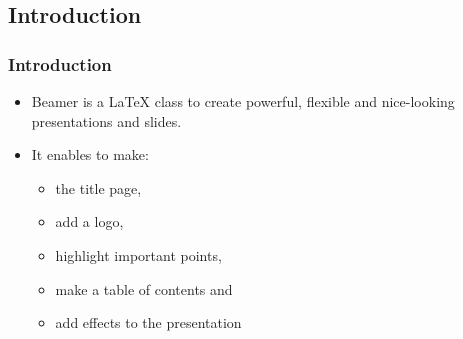 \documentclass[12pt]{beamer}
\begin{document}
\begin{frame}
\section{Introduction}
\frametitle{Introduction }
	\begin{itemize}\justifying
		\item Beamer is a \LaTeX{} class to create powerful, flexible and nice-looking presentations and slides. 
		\item It enables to make:
		\begin{itemize}
			\item the title page, 
			\item add a logo, 
			\item highlight important points, 
			\item make a table of contents and 
			\item add effects to the presentation
		\end{itemize} 
	\end{itemize}
\end{frame}
	
\end{document}
